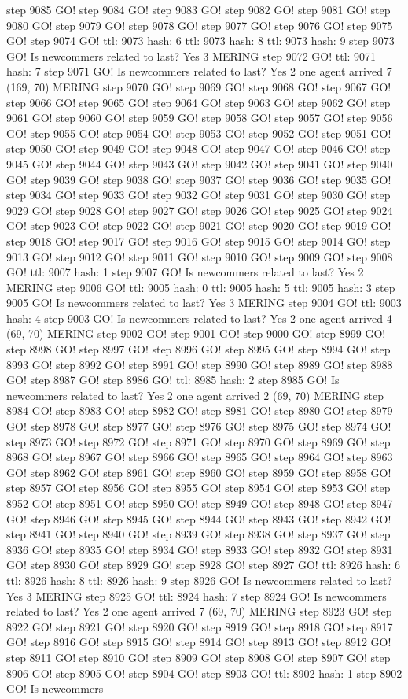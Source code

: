 step 9085 GO! step 9084 GO! step 9083 GO! step 9082 GO! step 9081 GO! step 9080 GO! step 9079 GO! step 9078 GO! step 9077 GO! step 9076 GO! step 9075 GO! step 9074 GO! ttl: 9073 hash: 6 ttl: 9073 hash: 8 ttl: 9073 hash: 9 step 9073 GO! Is newcommers related to last? Yes 3 MERING step 9072 GO! ttl: 9071 hash: 7 step 9071 GO! Is newcommers related to last? Yes 2 one agent arrived 7 (169, 70) MERING step 9070 GO! step 9069 GO! step 9068 GO! step 9067 GO! step 9066 GO! step 9065 GO! step 9064 GO! step 9063 GO! step 9062 GO! step 9061 GO! step 9060 GO! step 9059 GO! step 9058 GO! step 9057 GO! step 9056 GO! step 9055 GO! step 9054 GO! step 9053 GO! step 9052 GO! step 9051 GO! step 9050 GO! step 9049 GO! step 9048 GO! step 9047 GO! step 9046 GO! step 9045 GO! step 9044 GO! step 9043 GO! step 9042 GO! step 9041 GO! step 9040 GO! step 9039 GO! step 9038 GO! step 9037 GO! step 9036 GO! step 9035 GO! step 9034 GO! step 9033 GO! step 9032 GO! step 9031 GO! step 9030 GO! step 9029 GO! step 9028 GO! step 9027 GO! step 9026 GO! step 9025 GO! step 9024 GO! step 9023 GO! step 9022 GO! step 9021 GO! step 9020 GO! step 9019 GO! step 9018 GO! step 9017 GO! step 9016 GO! step 9015 GO! step 9014 GO! step 9013 GO! step 9012 GO! step 9011 GO! step 9010 GO! step 9009 GO! step 9008 GO! ttl: 9007 hash: 1 step 9007 GO! Is newcommers related to last? Yes 2 MERING step 9006 GO! ttl: 9005 hash: 0 ttl: 9005 hash: 5 ttl: 9005 hash: 3 step 9005 GO! Is newcommers related to last? Yes 3 MERING step 9004 GO! ttl: 9003 hash: 4 step 9003 GO! Is newcommers related to last? Yes 2 one agent arrived 4 (69, 70) MERING step 9002 GO! step 9001 GO! step 9000 GO! step 8999 GO! step 8998 GO! step 8997 GO! step 8996 GO! step 8995 GO! step 8994 GO! step 8993 GO! step 8992 GO! step 8991 GO! step 8990 GO! step 8989 GO! step 8988 GO! step 8987 GO! step 8986 GO! ttl: 8985 hash: 2 step 8985 GO! Is newcommers related to last? Yes 2 one agent arrived 2 (69, 70) MERING step 8984 GO! step 8983 GO! step 8982 GO! step 8981 GO! step 8980 GO! step 8979 GO! step 8978 GO! step 8977 GO! step 8976 GO! step 8975 GO! step 8974 GO! step 8973 GO! step 8972 GO! step 8971 GO! step 8970 GO! step 8969 GO! step 8968 GO! step 8967 GO! step 8966 GO! step 8965 GO! step 8964 GO! step 8963 GO! step 8962 GO! step 8961 GO! step 8960 GO! step 8959 GO! step 8958 GO! step 8957 GO! step 8956 GO! step 8955 GO! step 8954 GO! step 8953 GO! step 8952 GO! step 8951 GO! step 8950 GO! step 8949 GO! step 8948 GO! step 8947 GO! step 8946 GO! step 8945 GO! step 8944 GO! step 8943 GO! step 8942 GO! step 8941 GO! step 8940 GO! step 8939 GO! step 8938 GO! step 8937 GO! step 8936 GO! step 8935 GO! step 8934 GO! step 8933 GO! step 8932 GO! step 8931 GO! step 8930 GO! step 8929 GO! step 8928 GO! step 8927 GO! ttl: 8926 hash: 6 ttl: 8926 hash: 8 ttl: 8926 hash: 9 step 8926 GO! Is newcommers related to last? Yes 3 MERING step 8925 GO! ttl: 8924 hash: 7 step 8924 GO! Is newcommers related to last? Yes 2 one agent arrived 7 (69, 70) MERING step 8923 GO! step 8922 GO! step 8921 GO! step 8920 GO! step 8919 GO! step 8918 GO! step 8917 GO! step 8916 GO! step 8915 GO! step 8914 GO! step 8913 GO! step 8912 GO! step 8911 GO! step 8910 GO! step 8909 GO! step 8908 GO! step 8907 GO! step 8906 GO! step 8905 GO! step 8904 GO! step 8903 GO! ttl: 8902 hash: 1 step 8902 GO! Is newcommers 